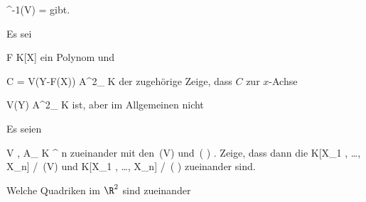 \mavergleichskettedisp
{\vergleichskette
{ \varphi^{-1}(V)
}
{ =} {
}
{ } {
}
{ } {
}
{ } {
}
}
{}{}{}
gibt.







{}
{





Es sei

\mavergleichskette
{\vergleichskette
{ F
}
{ \in }{ K[X]
}
{  }{
}
{    }{
}
{   }{
}
}
{}{}{}
ein Polynom und

\mavergleichskettedisp
{\vergleichskette
{ C
}
{ =} { V(Y-F(X))
}
{ \subset} { {\mathbb A}^{2}_{ K }
}
{ } {
}
{ } {
}
}
{}{}{}
der zugehörige
Zeige, dass $C$ zur $x$-Achse

\mavergleichskette
{\vergleichskette
{ V(Y)
}
{ \subset }{ {\mathbb A}^{2}_{ K }
}
{  }{
}
{    }{
}
{   }{
}
}
{}{}{}
ist, aber im Allgemeinen nicht





}
{} {}

{}
{





Es seien

\mavergleichskettedisp
{\vergleichskette
{V , 
}
{ \subset} { { {\mathbb A}_{  K  }^{  n   } }
}
{ } {
}
{ } {
}
{ } {}
}
{}{}{}
zueinander
mit den
\mathkor {} { \,(V)} {und} { \,( )} {.}
Zeige, dass dann die
\mathkor {} {K[X_1 , \ldots , X_n] /  \,(V)} {und} {K[X_1 , \ldots , X_n] /  \,( )} {}
zueinander
sind.





}
{} {}

{}
{





Welche Quadriken im $\R^2$
 {} {}
sind zueinander





}
{} {}

